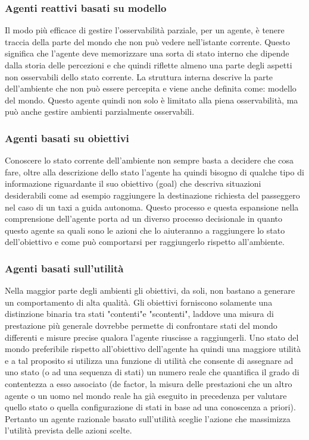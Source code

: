 \documentclass[11pt]{article}
\begin{document}
\subsubsection{Agenti reattivi basati su modello}
Il modo più efficace di gestire l'osservabilità parziale, per un agente, è tenere traccia della parte del mondo che non può vedere nell'istante corrente. Questo significa che l'agente deve memorizzare una sorta di stato interno che dipende dalla storia delle percezioni e che quindi riflette almeno una parte degli aspetti non osservabili dello stato corrente.
La struttura interna descrive la parte dell'ambiente che non può essere percepita e viene anche definita come: modello del mondo. Questo agente quindi non solo è limitato alla piena osservabilità, ma può anche gestire ambienti parzialmente osservabili.

\subsubsection{Agenti basati su obiettivi}
Conoscere lo stato corrente dell'ambiente non sempre basta a decidere che cosa fare, oltre alla descrizione dello stato l'agente ha quindi bisogno di qualche tipo di informazione riguardante il suo obiettivo (goal) che descriva situazioni desiderabili come ad esempio raggiungere la destinazione richiesta del passeggero nel caso di un taxi a guida autonoma.
Questo processo e questa espansione nella comprensione dell'agente porta ad un diverso processo decisionale in quanto questo agente sa quali sono le azioni che lo aiuteranno a raggiungere lo stato dell'obiettivo e come può comportarsi per raggiungerlo rispetto all'ambiente.

\subsubsection{Agenti basati sull'utilità}
Nella maggior parte degli ambienti gli obiettivi, da soli, non bastano a generare un comportamento di alta qualità. Gli obiettivi forniscono solamente una distinzione binaria tra stati "contenti"e "scontenti", laddove una misura di prestazione più generale dovrebbe permette di confrontare stati del mondo differenti e misure precise qualora l'agente riuscisse a raggiungerli. Uno stato del mondo preferibile rispetto all'obiettivo dell'agente ha quindi una maggiore utilità e a tal proposito si utilizza una funzione di utilità che consente di assegnare ad uno stato (o ad una sequenza di stati) un numero reale che quantifica il grado di contentezza a esso associato (de factor, la misura delle prestazioni che un altro agente o un uomo nel mondo reale ha già eseguito in precedenza per valutare quello stato o quella configurazione di stati in base ad una conoscenza a priori).
Pertanto un agente razionale basato sull'utilità sceglie l'azione che massimizza l'utilità prevista delle azioni scelte.
\end{document}
